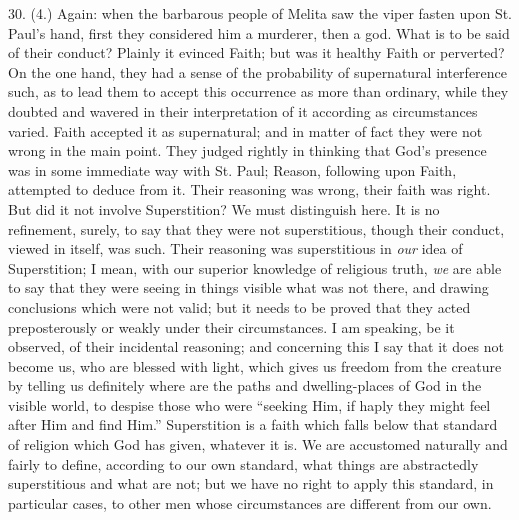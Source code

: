 30. (4.) Again: when the barbarous people of Melita saw the viper
fasten upon St. Paul's hand, first they considered him a murderer,
then a god. What is to be said of their conduct? Plainly it evinced
Faith; but was it healthy Faith or perverted? On the one hand, they
had a sense of the probability of supernatural interference such, as
to lead them to accept this occurrence as more than ordinary, while
they doubted and wavered in their interpretation of it according as
circumstances varied. Faith accepted it as supernatural; and in matter
of fact they were not wrong in the main point. They judged rightly in
thinking that God's presence was in some immediate way with St. Paul;
Reason, following upon Faith, attempted to deduce from it. Their
reasoning was wrong, their faith was right. But did it not involve
Superstition? We must distinguish here. It is no refinement, surely,
to say that they were not superstitious, though their conduct, viewed
in itself, was such. Their reasoning was superstitious in \emph{our}
idea of Superstition; I mean, with our superior knowledge of religious
truth, \emph{we} are able to say that they were seeing in things
visible what was not there, and drawing conclusions which were not
valid; but it needs to be proved that they acted preposterously or
weakly under their circumstances. I am speaking, be it observed, of
their incidental reasoning; and concerning this I say that it does not
become us, who are blessed with light, which gives us freedom from the
creature by telling us definitely where are the paths and
dwelling-places of God in the visible world, to despise those who were
``seeking Him, if haply they might feel after Him and find
Him.'' Superstition is a faith which falls below that standard of
religion which God has given, whatever it is. We are accustomed
naturally and fairly to define, according to our own standard, what
things are abstractedly superstitious and what are not; but we have no
right to apply this standard, in particular cases, to other men whose
circumstances are different from our own.

